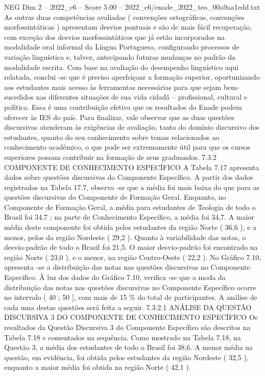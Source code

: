 \begin{textsample}{NEG Dim 2 – 2022\_c6 – Score 5.00 – 2022\_c6/enade\_2022\_teo\_00a9aa1edd.txt}
As outras duas competências avaliadas ( convenções ortográficas, convenções morfossintáticas ) apresentam desvios pontuais e são de mais fácil recuperação, com exceção dos desvios morfossintáticos que já estão incorporados na modalidade oral informal da Língua Portuguesa, configurando processos de variação linguística e, talvez, antecipando futuras mudanças no padrão da modalidade escrita.
Com base na avaliação do desempenho linguístico aqui relatada, conclui -se que é preciso aperfeiçoar a formação superior, oportunizando aos estudantes mais acesso às ferramentas necessárias para que sejam bem-sucedidos nas diferentes situações de sua vida cidadã – profissional, cultural e política.
Essa é uma contribuição efetiva que os resultados do Enade podem oferecer às IES do país.
Para finalizar, vale observar que as duas questões discursivas atenderam às exigências de avaliação, tanto do domínio discursivo dos estudantes, quanto do seu conhecimento sobre temas relacionados ao conhecimento acadêmico, o que pode ser extremamente útil para que os cursos superiores possam contribuir na formação de seus graduandos. 7.3.2 COMPONENTE DE CONHECIMENTO ESPECÍFICO A Tabela 7.17 apresenta dados sobre questões discursivas do Componente Específico.
A partir dos dados registrados na Tabela 17.7, observa -se que a média foi mais baixa do que para as questões discursivas do Componente de Formação Geral.
Enquanto, no Componente de Formação Geral, a média para estudantes de Teologia de todo o Brasil foi 34,7 ; na parte de Conhecimento Específico, a média foi 34,7.
A maior média deste componente foi obtida pelos estudantes da região Norte ( 36,6 ), e a menor, pelos da região Nordeste ( 29,2 ).
Quanto à variabilidade das notas, o desvio-padrão de todo o Brasil foi 21,5.
O maior desvio-padrão foi encontrado na região Norte ( 23,0 ), e o menor, na região Centro-Oeste ( 22,2 ).
No Gráfico 7.10, apresenta -se a distribuição das notas nas questões discursivas no Componente Específico.
À luz dos dados do Gráfico 7.10, verifica -se que a moda da distribuição das notas nas questões discursivas no Componente Específico ocorre no intervalo ( 40 ; 50 ], com mais de 15 \% do total de participantes.
A análise de cada uma destas questões será feita a seguir. 7.3.2.1 ANÁLISE DA QUESTÃO DISCURSIVA 3 DO COMPONENTE DE CONHECIMENTO ESPECÍFICO Os resultados da Questão Discursiva 3 do Componente Específico são descritos na Tabela 7.18 e comentados na sequência.
Como mostrado na Tabela 7.18, na Questão 3, a média dos estudantes de todo o Brasil foi 38,6.
A menor média na questão, em evidência, foi obtida pelos estudantes da região Nordeste ( 32,5 ), enquanto a maior média foi obtida na região Norte ( 42,1 ).

\end{textsample}
